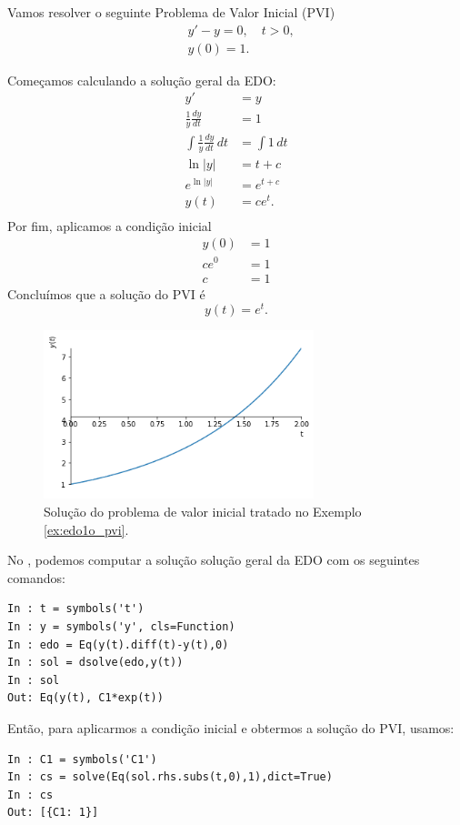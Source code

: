 \begin{ex}\label{ex:edo1o_pvi}
  Vamos resolver o seguinte Problema de Valor Inicial (PVI)
  \begin{align}
    &y' - y = 0, \quad t>0,\\
    &y(0) = 1.
  \end{align}
  
  Começamos calculando a solução geral da EDO:
  \begin{align}
    y' &= y\\
    \frac{1}{y}\frac{dy}{dt} &= 1 \\
     \int \frac{1}{y}\frac{dy}{dt}\,dt &= \int 1\,dt \\
       \ln|y| &= t + c \\
    e^{\ln|y|} &= e^{t+c}\\
    y(t) &= ce^{t}.\\
  \end{align}
  Por fim, aplicamos a condição inicial
  \begin{align}
    y(0) &= 1 \\
    ce^{0} &= 1 \\
    c &= 1
  \end{align}
  Concluímos que a solução do PVI é
  \begin{equation}
    y(t) = e^{t}.
  \end{equation}

  \begin{figure}[H]
    \centering
    \includegraphics[width=0.7\textwidth]{cap_edo1ordem/dados/fig_ex_edo1o_pvi/fig_ex_edo1o_pvi}
    \caption{Solução do problema de valor inicial tratado no Exemplo \ref{ex:edo1o_pvi}.}
    \label{fig:ex_edo1o_pvi}
  \end{figure}

  \ifispython
  No \python, podemos computar a solução solução geral da EDO com os seguintes comandos:
\begin{verbatim}
In : t = symbols('t')
In : y = symbols('y', cls=Function)
In : edo = Eq(y(t).diff(t)-y(t),0)
In : sol = dsolve(edo,y(t))
In : sol
Out: Eq(y(t), C1*exp(t))
\end{verbatim}
Então, para aplicarmos a condição inicial e obtermos a solução do PVI, usamos:
\begin{verbatim}
In : C1 = symbols('C1')
In : cs = solve(Eq(sol.rhs.subs(t,0),1),dict=True)
In : cs
Out: [{C1: 1}]


\end{verbatim}
\end{ex}
